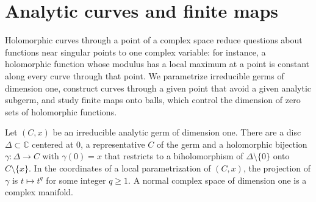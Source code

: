 \section{Analytic curves and finite maps}\label{sec:analytic-curves-finite-maps}

Holomorphic curves through a point of a complex space reduce questions about functions near singular points to one complex variable: for instance, a holomorphic function whose modulus has a local maximum at a point is constant along every curve through that point. We parametrize irreducible germs of dimension one, construct curves through a given point that avoid a given analytic subgerm, and study finite maps onto balls, which control the dimension of zero sets of holomorphic functions.

\begin{proposition}\label{prop:analytic-curve-parametrization}
Let $(C,x)$ be an irreducible analytic germ of dimension one. There are a disc $\Delta\subset\mathbb C$ centered at $0$, a representative $C$ of the germ and a holomorphic bijection $\gamma\colon\Delta\to C$ with $\gamma(0)=x$ that restricts to a biholomorphism of $\Delta\setminus\{0\}$ onto $C\setminus\{x\}$. In the coordinates of a local parametrization of $(C,x)$, the projection of $\gamma$ is $t\mapsto t^q$ for some integer $q\geq1$. A normal complex space of dimension one is a complex manifold.
\end{proposition}
